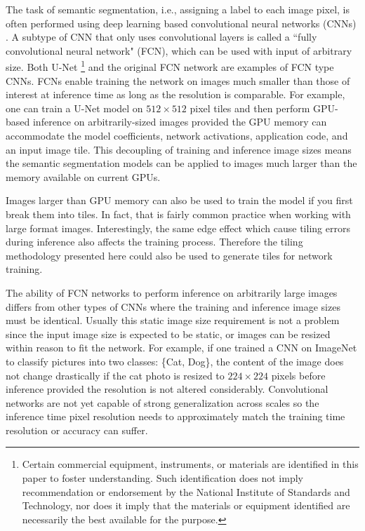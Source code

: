 \documentclass[10pt, indentfirst]{article}
\begin{document}
The task of semantic segmentation, i.e., assigning a label to each image pixel, is often performed using deep learning based convolutional neural networks (CNNs) \citep{Badrinarayanan2015a,Ronneberger2015a}.
A subtype of CNN that only uses convolutional layers is called a ``fully convolutional neural network" (FCN), which can be used with input of arbitrary size.
Both U-Net \footnote{Certain commercial equipment, instruments, or materials are identified in this paper to foster understanding. Such identification does not imply recommendation or endorsement by the National Institute of Standards and Technology, nor does it imply that the materials or equipment identified are necessarily the best available for the purpose.}\citep{Ronneberger2015a} and the original FCN network \citep{Long2015} are examples of FCN type CNNs.
FCNs enable training the network on images much smaller than those of interest at inference time as long as the resolution is comparable.
For example, one can train a U-Net model on $512 \times 512$ pixel tiles and then perform GPU-based inference on arbitrarily-sized images provided the GPU memory can accommodate the model coefficients, network activations, application code, and an input image tile.
This decoupling of training and inference image sizes means the semantic segmentation models can be applied to images much larger than the memory available on current GPUs.

Images larger than GPU memory can also be used to train the model if you first break them into tiles.
In fact, that is fairly common practice when working with large format images.
Interestingly, the same edge effect which cause tiling errors during inference also affects the training process.
Therefore the tiling methodology presented here could also be used to generate tiles for network training.

The ability of FCN networks to perform inference on arbitrarily large images differs from other types of CNNs where the training and inference image sizes must be identical.
Usually this static image size requirement is not a problem since the input image size is expected to be static, or images can be resized within reason to fit the network.
For example, if one trained a CNN on ImageNet \citep{Russakovsky2015} to classify pictures into two classes: \{Cat, Dog\}, the content of the image does not change drastically if the cat photo is resized to $224 \times 224$ pixels before inference provided the resolution is not altered considerably.
Convolutional networks are not yet capable of strong generalization across scales \citep{Jaderberg2015,Lin2017a} so the inference time pixel resolution needs to approximately match the training time resolution or accuracy can suffer.
\end{document}
